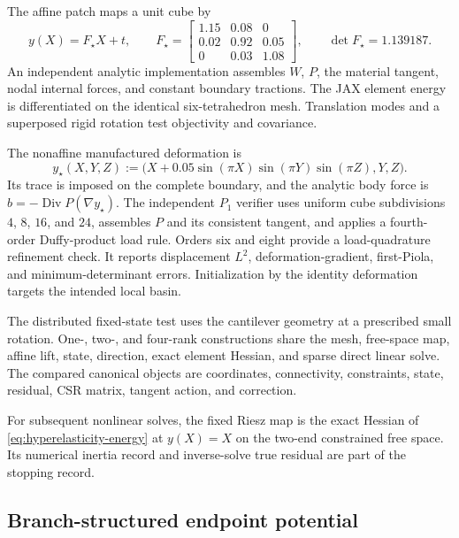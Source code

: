 The affine patch maps a unit cube by
\begin{equation}
  y(X)=F_\star X+t,
  \qquad
  F_\star=
  \begin{bmatrix}
    1.15&0.08&0\\
    0.02&0.92&0.05\\
    0&0.03&1.08
  \end{bmatrix},
  \qquad \det F_\star=1.139187.
  \label{eq:hyperelastic-affine-patch}
\end{equation}
An independent analytic implementation assembles $W$, $P$, the material
tangent, nodal internal forces, and constant boundary tractions. The JAX element
energy is differentiated on the identical six-tetrahedron mesh. Translation
modes and a superposed rigid rotation test objectivity and covariance.

The nonaffine manufactured deformation is
\begin{equation}
  y_\star(X,Y,Z)
  :=\bigl(X+0.05\sin(\pi X)\sin(\pi Y)\sin(\pi Z),Y,Z\bigr).
  \label{eq:hyperelastic-manufactured}
\end{equation}
Its trace is imposed on the complete boundary, and the analytic body force is
$b=-\operatorname{Div}P(\nabla y_\star)$. The independent $P_1$ verifier uses
uniform cube subdivisions $4$, $8$, $16$, and $24$, assembles $P$ and its
consistent tangent, and applies a fourth-order Duffy-product load rule. Orders
six and eight provide a load-quadrature refinement check. It reports
displacement $L^2$, deformation-gradient, first-Piola, and minimum-determinant
errors. Initialization by the identity deformation targets the intended local
basin.

The distributed fixed-state test uses the cantilever geometry at a
prescribed small rotation. One-, two-, and four-rank constructions share the mesh,
free-space map, affine lift, state, direction, exact element Hessian, and sparse
direct linear solve. The compared canonical objects are coordinates, connectivity,
constraints, state, residual, CSR matrix, tangent action, and correction.

For subsequent nonlinear solves, the fixed Riesz map is the exact Hessian of
\eqref{eq:hyperelasticity-energy} at $y(X)=X$ on the two-end constrained free
space. Its numerical inertia record and inverse-solve true residual are part of the
stopping record.

\subsection{Branch-structured endpoint potential}
\label{sec:bench-plasticity3d}

